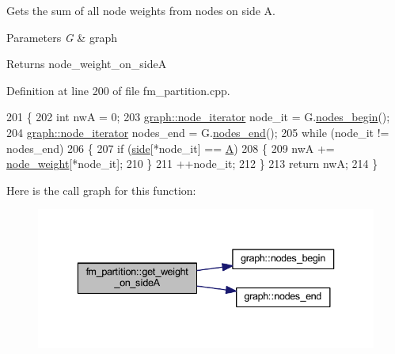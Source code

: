 Gets the sum of all node weights from nodes on side A.


\begin{DoxyParams}{Parameters}
{\em G} & graph \\
\hline
\end{DoxyParams}
\begin{DoxyReturn}{Returns}
{\ttfamily node\+\_\+weight\+\_\+on\+\_\+sideA} 
\end{DoxyReturn}


Definition at line 200 of file fm\+\_\+partition.\+cpp.


\begin{DoxyCode}
201 \{
202     \textcolor{keywordtype}{int} nwA = 0;
203     \mbox{\hyperlink{classgraph_a2cb374b84c133ce13f94e73c3e5da7fa}{graph::node\_iterator}} node\_it = G.\mbox{\hyperlink{classgraph_aec053a4b509d1be804237a80044c54c0}{nodes\_begin}}();
204     \mbox{\hyperlink{classgraph_a2cb374b84c133ce13f94e73c3e5da7fa}{graph::node\_iterator}} nodes\_end = G.\mbox{\hyperlink{classgraph_abbf9c0cb5629e98e1142254911238173}{nodes\_end}}();
205     \textcolor{keywordflow}{while} (node\_it != nodes\_end)
206     \{
207     \textcolor{keywordflow}{if} (\mbox{\hyperlink{classfm__partition_af83309e781e9658fc0ff923ced087bfc}{side}}[*node\_it] == \mbox{\hyperlink{classfm__partition_a738e75c601403754e61e6dac623fd3ab}{A}})
208     \{
209         nwA += \mbox{\hyperlink{classfm__partition_ae1ba643b4bd6721075ab7b608bcf3cd6}{node\_weight}}[*node\_it];
210     \}
211     ++node\_it;
212     \}
213     \textcolor{keywordflow}{return} nwA;
214 \}
\end{DoxyCode}
Here is the call graph for this function\+:\nopagebreak
\begin{figure}[H]
\begin{center}
\leavevmode
\includegraphics[width=336pt]{classfm__partition_a3f1ddcff1ba7a4c4090f947f918b5331_cgraph}
\end{center}
\end{figure}
\mbox{\label{classfm__partition_a9e380da1dc654fcffdf4ac2418c6ef80}} 
